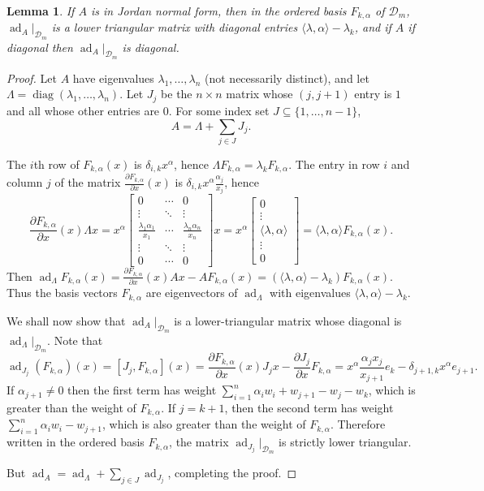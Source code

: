 \documentclass{article}
\newtheorem{lemma}[theorem]{Lemma}
\newcommand{\diag}{\operatorname{diag}}
\newcommand{\ad}{\operatorname{ad}}
\begin{document}
\begin{lemma}
\label{monomialbasis}
If $A$ is in Jordan normal form, then in the ordered basis $F_{k,\alpha}$ of $\mathscr{D}_m$, $\ad_A|_{\mathscr{D}_m}$ is a lower triangular matrix with diagonal entries
$\langle \lambda,\alpha \rangle -\lambda_k$, and if $A$ if diagonal then $\ad_A|_{\mathscr{D}_m}$ is diagonal.
\end{lemma}
\begin{proof}
Let $A$ have eigenvalues $\lambda_1,\ldots,\lambda_n$ (not necessarily distinct), and let $\Lambda=\diag(\lambda_1,\ldots,\lambda_n)$. Let $J_j$ be the $n \times n$ matrix whose $(j,j+1)$ entry is $1$ and all whose
other entries are $0$. For some index set $J \subseteq \{1,\ldots,n-1\}$,
\[
A=\Lambda+\sum_{j \in J} J_j.
\]

The $i$th row of $F_{k,\alpha}(x)$ is $\delta_{i,k} x^\alpha$, 
hence $\Lambda F_{k,\alpha}=
\lambda_k F_{k,\alpha}$. The entry in
row $i$ and column $j$ of the matrix $\frac{\partial F_{k,\alpha}}{\partial x}(x)$
is $\delta_{i,k} x^\alpha \frac{\alpha_j}{x_j}$,
hence
\[
\frac{\partial F_{k,\alpha}}{\partial x}(x) \Lambda x
=x^\alpha \begin{bmatrix}0&\cdots&0\\
\vdots&\ddots&\vdots\\
\frac{\lambda_1 \alpha_1}{x_1}&\cdots&\frac{\lambda_n \alpha_n}{x_n}\\
\vdots&\ddots&\vdots\\
0&\cdots&0
\end{bmatrix}x
=x^\alpha \begin{bmatrix}0\\ \vdots \\ \langle \lambda,\alpha \rangle \\ \vdots \\ 0 \end{bmatrix}
=
\langle \lambda,\alpha \rangle F_{k,\alpha}(x).
\]
Then $\ad_\Lambda F_{k,\alpha}(x)=\frac{\partial F_{k,\alpha}}{\partial x}(x)Ax
-AF_{k,\alpha}(x)=(\langle \lambda,\alpha \rangle -\lambda_k) F_{k,\alpha}(x)$. Thus the basis vectors $F_{k,\alpha}$ are eigenvectors of $\ad_\Lambda$ with  eigenvalues $\langle \lambda,\alpha \rangle -\lambda_k$.

We shall now show that $\ad_A|_{\mathscr{D}_m}$ is a lower-triangular matrix whose diagonal
is $\ad_\Lambda|_{\mathscr{D}_m}$. Note that
\[
\ad_{J_j}(F_{k,\alpha})(x)=[J_j,F_{k,\alpha}](x)=\frac{\partial F_{k,\alpha}}{\partial x}(x) J_jx-\frac{\partial J_j}{\partial x}F_{k,\alpha}
=x^\alpha \frac{\alpha_j x_j}{x_{j+1}} e_k-\delta_{j+1,k} x^\alpha e_{j+1}.
\]
If $\alpha_{j+1} \neq 0$ then the first term has weight $\sum_{i=1}^n \alpha_i w_i+ w_{j+1} -w_j -w_k$, which is greater
than the weight of $F_{k,\alpha}$. If $j=k+1$, then the second term has weight $\sum_{i=1}^n \alpha_i w_i -w_{j+1}$, which is also greater than the weight of $F_{k,\alpha}$. Therefore written in the ordered basis $F_{k,\alpha}$, the matrix
$\ad_{J_j}|_{\mathscr{D}_m}$ is strictly lower triangular. 

But $\ad_A=\ad_\Lambda+\sum_{j \in J} \ad_{J_j}$, completing the proof.
\end{proof}
\end{document}
